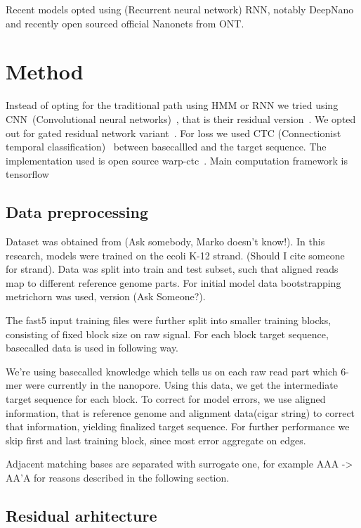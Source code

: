 \documentclass[times, utf8, seminar, numeric]{fer}
\begin{document}
Recent models opted using (Recurrent neural network) RNN, notably DeepNano~\cite{deepnano} and recently open sourced official Nanonets from ONT.

\chapter{Method}

Instead of opting for the traditional path using HMM or RNN we tried using CNN~(Convolutional neural networks)~\cite{lecun-98}, that is their residual version~\cite{he2016deep}. We opted out for gated residual network variant~\cite{savarese2016learning}. For loss we used CTC (Connectionist temporal classification)~\cite{graves2006connectionist} between basecallled and the target sequence. The implementation used is open source warp-ctc~\cite{warpctc}. Main computation framework is tensorflow~\cite{tensorflow2015-whitepaper}

\section{Data preprocessing}

Dataset was obtained from (Ask somebody, Marko doesn't know!). In this research, models were trained on the ecoli K-12 strand. (Should I cite someone for strand). Data was split into train and test subset, such that aligned reads map to different reference genome parts. For initial model data bootstrapping metrichorn was used, version (Ask Someone?).

The fast5 input training files were further split into smaller training blocks, consisting of fixed block size on raw signal. For each block target sequence, basecalled data is used in following way.

We're using basecalled knowledge which tells us on each raw read part which 6-mer were currently in the nanopore. Using this data, we get the intermediate target sequence for each block. To correct for model errors, we use aligned information, that is reference genome and alignment data(cigar string) to correct that information, yielding finalized target sequence. For further performance we skip first and last training block, since most error aggregate on edges.

Adjacent matching bases are separated with surrogate one, for example AAA -> AA'A for reasons described in the following section.
\section{Residual arhitecture}
\end{document}

